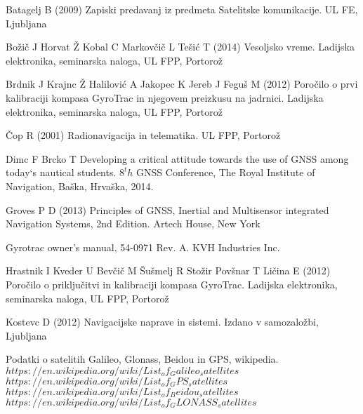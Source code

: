 %
%
%
% 
% 
%
\begin{thebibliography}{99.}
%
%
%
 Batagelj B (2009) Zapiski predavanj iz predmeta Satelitske komunikacije. UL FE, Ljubljana

 Božič J Horvat Ž Kobal C Markovčič L Tešić T (2014)  Vesoljsko vreme. Ladijska elektronika, seminarska naloga, UL FPP, Portorož %

 Brdnik J Krajnc Ž Halilović A Jakopec K Jereb J Feguš M (2012)  Poročilo o prvi kalibraciji kompasa GyroTrac in njegovem preizkusu na jadrnici. Ladijska elektronika, seminarska naloga, UL FPP, Portorož %

 Čop R (2001) Radionavigacija in telematika. UL FPP, Portorož %

 Dimc F Brcko T Developing a critical attitude towards the use of GNSS among today`s nautical students. $8^th$ GNSS Conference, The Royal Institute of Navigation, Baška, Hrvaška, 2014. %

 Groves P D (2013) Principles of GNSS, Inertial and Multisensor integrated Navigation Systems, 2nd Edition. Artech House, New York %

 Gyrotrac owner's manual, 54-0971 Rev. A. KVH Industries Inc.   %

 Hrastnik I Kveder U Bevčič M Šušmelj R Stožir Povšnar T Ličina E (2012)  Poročilo o priključitvi in kalibraciji kompasa GyroTrac. Ladijska elektronika, seminarska naloga, UL FPP, Portorož %

 Kostevc D (2012) Navigacijske naprave in sistemi. Izdano v samozaložbi, Ljubljana

 Podatki o satelitih Galileo, Glonass, Beidou in GPS, wikipedia. \\
 $https://en.wikipedia.org/wiki/List_of_Galileo_satellites$ \\ $https://en.wikipedia.org/wiki/List_of_GPS_satellites$ \\ $https://en.wikipedia.org/wiki/List_of_Beidou_satellites$ \\ $https://en.wikipedia.org/wiki/List_of_GLONASS_satellites$




\end{thebibliography}

